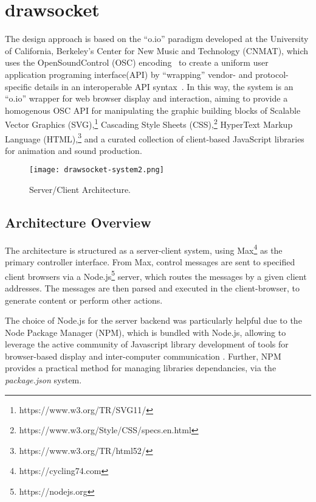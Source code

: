 \section{drawsocket}\label{sec:drawsocket}
The \drawsocket design approach is based on the ``o.io'' paradigm developed at the University of California, Berkeley's Center for New Music and Technology (CNMAT), which uses the OpenSoundControl (OSC) encoding~\cite{wright:osc} to create a uniform user application programing interface(API) by ``wrapping'' vendor- and protocol-specific details in an interoperable API syntax~\cite{freed2014io, maccallum2015dynamic}.
In this way, the \drawsocket system is an ``o.io'' wrapper for web browser display and interaction, aiming to provide a homogenous OSC API for manipulating the graphic building blocks of Scalable Vector Graphics (SVG),\footnote{https://www.w3.org/TR/SVG11/} Cascading Style Sheets (CSS),\footnote{https://www.w3.org/Style/CSS/specs.en.html} HyperText Markup Language (HTML),\footnote{https://www.w3.org/TR/html52/} and a curated collection of client-based JavaScript libraries for animation and sound production.

\begin{figure*}[]
\centering
\texttt{[image: drawsocket-system2.png]}
\caption{\drawsocket Server/Client Architecture. 
\label{fig:drawsocket-arch}}
\end{figure*}

\subsection{Architecture Overview}
The \drawsocket architecture is structured as a server-client system, using Max\footnote{https://cycling74.com} as the primary controller interface. 
From Max, control messages are sent to specified client browsers via a Node.js\footnote{https://nodejs.org} server, which routes the messages by a given client addresses.
The messages are then parsed and executed in the client-browser, to generate content or perform other actions.

The choice of Node.js for the server backend was particularly helpful due to the Node Package Manager (NPM), which is bundled with Node.js, allowing \drawsocket to leverage the active community of Javascript library development of tools for browser-based display and inter-computer communication \cite{trockman2018adding}. 
Further, NPM provides a practical method for managing libraries dependancies, via the \textit{package.json} system.

